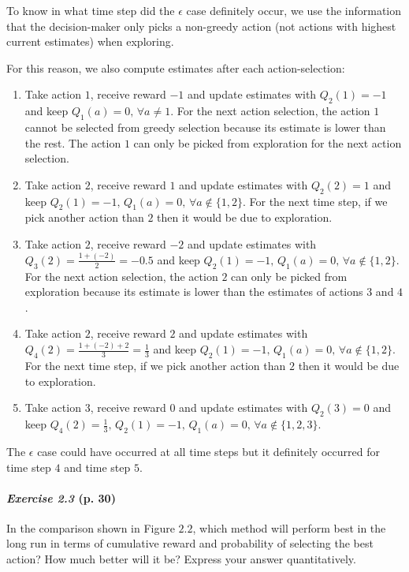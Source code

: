\documentclass[10pt,a4paper]{article}
\begin{document}
To know in what time step did the $\epsilon$ case definitely occur, we use the information that the decision-maker only picks a non-greedy action (not actions with highest current estimates) when exploring.

For this reason, we also compute estimates after each action-selection:
\begin{enumerate}
\item Take action $1$, receive reward $-1$ and update estimates with $Q_2(1)=-1$ and keep $Q_1(a)=0,\, \forall a \neq 1$. For the next action selection, the action $1$ cannot be selected from greedy selection because its estimate is lower than the rest. The action $1$ can only be picked from exploration for the next action selection.

\item Take action $2$, receive reward $1$ and update estimates with $Q_2(2)=1$ and keep $Q_2(1)=-1,\, Q_1(a)=0,\, \forall a \notin \{1, 2\}$. For the next time step, if we pick another action than $2$ then it would be due to exploration.

\item Take action $2$, receive reward $-2$ and update estimates with $Q_3(2)=\frac{1 + (-2)}{2} = -0.5$ and keep $Q_2(1)=-1,\, Q_1(a)=0,\, \forall a \notin \{1, 2\}$. For the next action selection, the action $2$ can only be picked from exploration because its estimate is lower than the estimates of actions $3$ and $4$.

\item Take action $2$, receive reward $2$ and update estimates with $Q_4(2)=\frac{1 + (-2) + 2}{3} = \frac{1}{3}$ and keep $Q_2(1)=-1,\, Q_1(a)=0,\, \forall a \notin \{1, 2\}$. For the next time step, if we pick another action than $2$ then it would be due to exploration. 

\item Take action $3$, receive reward $0$ and update estimates with $Q_2(3)=0$ and keep $Q_4(2) = \frac{1}{3},\, Q_2(1)=-1,\, Q_1(a)=0,\, \forall a \notin \{1, 2, 3\}$.

\end{enumerate}

The $\epsilon$ case could have occurred at all time steps but it definitely occurred  for time step $4$ and time step $5$.

\paragraph{\textit{Exercise 2.3} (p. 30)} In the comparison shown in Figure $2.2$, which method will perform best in
the long run in terms of cumulative reward and probability of selecting the best action?
How much better will it be? Express your answer quantitatively.
\end{document}
